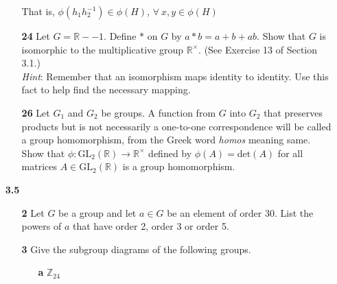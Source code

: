 \documentclass[paper=usletter, fontsize=12pt]{article}
\begin{document}
\begin{itemize}
\begin{itemize}
\begin{cproof}
                That is, $\phi(h_1h_2^{-1}) \in \phi(H)$, $\forall \ x,y \in
                \phi(H)$ \qedhere

            \end{cproof}

            \item[\textbf{24}] Let $G = \mathbb{R} - {-1}$. Define $*$ on $G$
            by $a*b = a+b+ab$. Show that $G$ is isomorphic to the
            multiplicative group $\mathbb{R}^{\times}$. (See Exercise 13 of
            Section 3.1.) \\ \textit{Hint}: Remember that an isomorphism maps
            identity to identity. Use this fact to help find the necessary
            mapping.
            \begin{cproof}
            \end{cproof}

            \item[\textbf{26}] Let $G_1$ and $G_2$ be groups. A function from
            $G$ into $G_2$ that preserves products but is not necessarily a
            one-to-one correspondence will be called a group homomorphism, from
            the Greek word \textit{homos} meaning same. Show that $\phi:
            \text{GL}_2(\mathbb{R}) \rightarrow \mathbb{R}^{\times}$ defined by
            $\phi(A)=\text{det}(A)$ for all matrices $A \in
            \text{GL}_2(\mathbb{R})$ is a group homomorphism.
            \begin{cproof}
            \end{cproof}

        \end{itemize}

        \item[\textbf{3.5}]

        \begin{itemize}

            \item[\textbf{2}] Let $G$ be a group and let $a \in G$ be an
            element of order 30. List the powers of $a$ that have order 2,
            order 3 or order 5.
            \begin{cproof}
            \end{cproof}

            \item[\textbf{3}] Give the subgroup diagrams of the following
            groups.
            \begin{enumerate}

                \item[\textbf{a}] $\mathbb{Z}_{24}$
                \begin{cproof}
                \end{cproof}


\end{enumerate}
\end{itemize}
\end{itemize}
\end{document}
